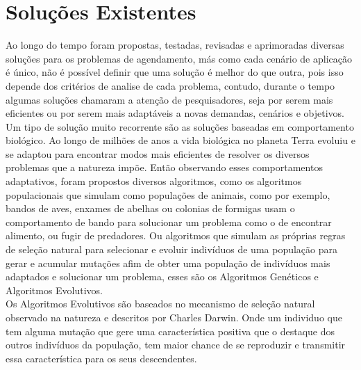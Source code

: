 \section{Soluções Existentes}
Ao longo do tempo foram propostas, testadas, revisadas e aprimoradas diversas soluções para os problemas de agendamento, más como cada cenário de aplicação é único, não é possível definir que uma solução é melhor do que outra, pois isso depende dos critérios de analise de cada problema, contudo, durante o tempo algumas soluções chamaram a atenção de pesquisadores, seja por serem mais eficientes ou por serem mais adaptáveis a novas demandas, cenários e objetivos.\\
\indent Um tipo de solução muito recorrente são as soluções baseadas em comportamento biológico. 
%
Ao longo de milhões de anos a vida biológica no planeta Terra evoluiu e se adaptou para encontrar modos mais eficientes de resolver os diversos problemas que a natureza impõe. 
Então observando esses comportamentos adaptativos, foram propostos diversos algoritmos, 
como os algoritmos populacionais que simulam como populações de animais, como por exemplo, bandos de aves, enxames de abelhas ou colonias de formigas usam o comportamento de bando para solucionar um problema como o de encontrar alimento, ou fugir de predadores. 
Ou algoritmos que simulam as próprias regras de seleção natural para selecionar e evoluir indivíduos de uma população para gerar e acumular mutações afim de obter uma população de indivíduos mais adaptados e solucionar um problema, esses são os Algoritmos Genéticos e Algoritmos Evolutivos.\\
\indent Os Algoritmos Evolutivos são baseados no mecanismo de seleção natural observado na natureza e descritos por Charles Darwin. Onde um individuo que tem alguma mutação que gere uma característica positiva que o destaque dos outros indivíduos da população, tem maior chance de se reproduzir e transmitir essa característica para os seus descendentes.\\

